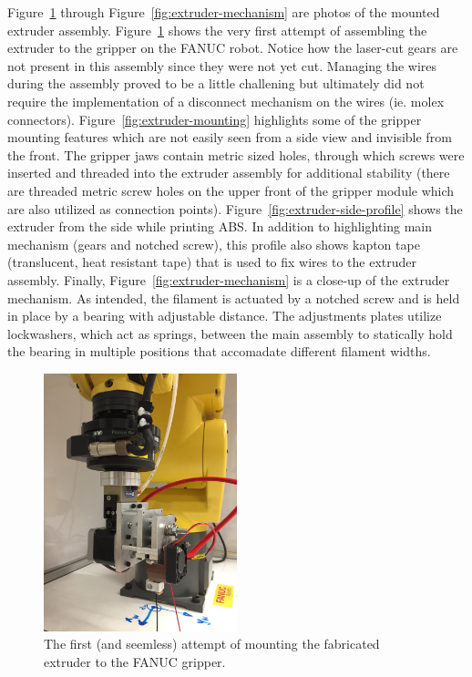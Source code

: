 Figure~\ref{fig:extruder-first-mount} through Figure~\ref{fig:extruder-mechanism} are photos of the mounted extruder assembly. Figure~\ref{fig:extruder-first-mount} shows the very first attempt of assembling the extruder to the gripper on the FANUC robot. Notice how the laser-cut gears are not present in this assembly since they were not yet cut. Managing the wires during the assembly proved to be a little challening but ultimately did not require the implementation of a disconnect mechanism on the wires (ie. molex connectors). Figure~\ref{fig:extruder-mounting} highlights some of the gripper mounting features which are not easily seen from a side view and invisible from the front. The gripper jaws contain metric sized holes, through which screws were inserted and threaded into the extruder assembly for additional stability (there are threaded metric screw holes on the upper front of the gripper module which are also utilized as connection points). Figure~\ref{fig:extruder-side-profile} shows the extruder from the side while printing ABS. In addition to highlighting main mechanism (gears and notched screw), this profile also shows kapton tape (translucent, heat resistant tape) that is used to fix wires to the extruder assembly. Finally, Figure~\ref{fig:extruder-mechanism} is a close-up of the extruder mechanism. As intended, the filament is actuated by a notched screw and is held in place by a bearing with adjustable distance. The adjustments plates utilize lockwashers, which act as springs, between the main assembly to statically hold the bearing in multiple positions that accomadate different filament widths.\\

\begin{figure}[h!]
\centering
\includegraphics[width=0.5\textwidth]{./figures/extruder-first-mount}
\caption{The first (and seemless) attempt of mounting the fabricated extruder to the FANUC gripper.}
\label{fig:extruder-first-mount}
\end{figure}

